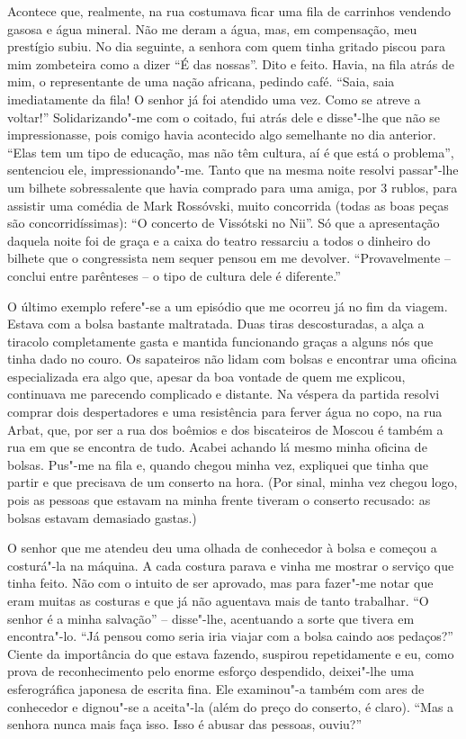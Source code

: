 Acontece que, realmente, na rua costumava ficar uma fila de carrinhos
vendendo gasosa e água mineral. Não me deram a água, mas, em
compensação, meu prestígio subiu. No dia seguinte, a senhora com quem
tinha gritado piscou para mim zombeteira como a dizer ``É das nossas''.
Dito e feito. Havia, na fila atrás de mim, o representante de uma nação
africana, pedindo café. ``Saia, saia imediatamente da fila! O senhor já
foi atendido uma vez. Como se atreve a voltar!'' Solidarizando"-me com o
coitado, fui atrás dele e disse"-lhe que não se impressionasse, pois
comigo havia acontecido algo semelhante no dia anterior. ``Elas tem um
tipo de educação, mas não têm cultura, aí é que está o problema'',
sentenciou ele, impressionando"-me. Tanto que na mesma noite resolvi
passar"-lhe um bilhete sobressalente que havia comprado para uma amiga,
por 3 rublos, para assistir uma comédia de Mark Rossóvski, muito
concorrida (todas as boas peças são concorridíssimas): ``O concerto de
Vissótski no Nii''. Só que a apresentação daquela noite foi de graça e a
caixa do teatro ressarciu a todos o dinheiro do bilhete que o
congressista nem sequer pensou em me devolver. ``Provavelmente --
conclui entre parênteses -- o tipo de cultura dele é diferente.''

O último exemplo refere"-se a um episódio que me ocorreu já no fim da
viagem. Estava com a bolsa bastante maltratada. Duas tiras
descosturadas, a alça a tiracolo completamente gasta e mantida
funcionando graças a alguns nós que tinha dado no couro. Os sapateiros
não lidam com bolsas e encontrar uma oficina especializada era algo que,
apesar da boa vontade de quem me explicou, continuava me parecendo
complicado e distante. Na véspera da partida resolvi comprar dois
despertadores e uma resistência para ferver água no copo, na rua Arbat,
que, por ser a rua dos boêmios e dos biscateiros de Moscou é também a
rua em que se encontra de tudo. Acabei achando lá mesmo minha oficina de
bolsas. Pus"-me na fila e, quando chegou minha vez, expliquei que tinha
que partir e que precisava de um conserto na hora. (Por sinal, minha vez
chegou logo, pois as pessoas que estavam na minha frente tiveram o
conserto recusado: as bolsas estavam demasiado gastas.)

O senhor que me atendeu deu uma olhada de conhecedor à bolsa e começou a
costurá"-la na máquina. A cada costura parava e vinha me mostrar o
serviço que tinha feito. Não com o intuito de ser aprovado, mas para
fazer"-me notar que eram muitas as costuras e que já não aguentava mais
de tanto trabalhar. ``O senhor é a minha salvação'' -- disse"-lhe,
acentuando a sorte que tivera em encontra"-lo. ``Já pensou como seria
iria viajar com a bolsa caindo aos pedaços?'' Ciente da importância do
que estava fazendo, suspirou repetidamente e eu, como prova de
reconhecimento pelo enorme esforço despendido, deixei"-lhe uma
esferográfica japonesa de escrita fina. Ele examinou"-a também com ares
de conhecedor e dignou"-se a aceita"-la (além do preço do conserto, é
claro). ``Mas a senhora nunca mais faça isso. Isso é abusar das pessoas,
ouviu?''

